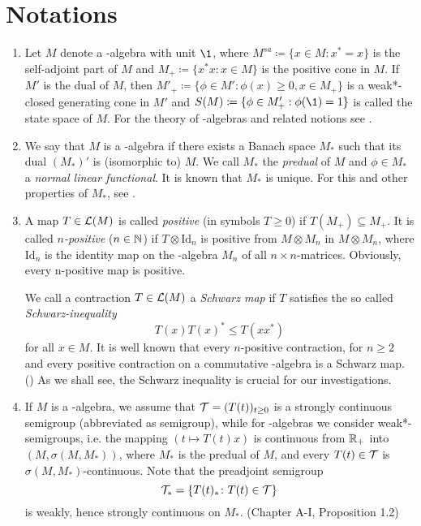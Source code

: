 \section{Notations}\label{sec:d1-1}
\begin{enumerate}[1., wide, labelsep=1em]

\item
Let $ M $ denote a \CA-algebra with unit $ \1 $, where 
%
$
	M^{sa} \coloneqq \{x \in M \colon x^{*} = x\} 
$
%
is the self-adjoint part of $ M $ and 
%
$
	M_{+} \coloneqq \{ x^{*}x \colon x \in M\} 
$
%
is the positive cone in $ M $.
If $ M' $ is the dual of $ M $, then 
%
$
	M'_{+} \coloneqq \{\phi \in M' \colon \phi(x) \geq 0, x \in M_{+}\} 
$
%
is a weak*-closed generating cone in $ M' $ and 
%
$
	S(M) \coloneqq \{\phi \in M'_{+}: \phi(\1) = 1\} 
$
%
is called the state space of $ M $. 
For the theory of \CA-algebras and related notions see \citet{Pedersen:1979}.

\item
We say that $ M $ is a \WA-algebra if there exists a Banach space $ M_{*} $ such that its dual $ (M_{*})' $ is (isomorphic to) $ M $.
We call $ M_{*} $ the \emph{predual} of $ M $ and $ \phi \in M_{*} $ a \emph{normal linear functional}.
It is known that $ M_{*} $ is unique. %
For this and other properties of $M_{*} $, see \citet[Chapter III]{takesaki:1979}.

\item
A map $ T \in \mathcal{L}(M) $ is called \emph{positive} (in symbols $ T \geq 0 $) if $ T(M_{+}) \subseteq M_{+} $.
It is called \emph{$n$-positive} ($ n \in \mathbb{N} $) if $ T \otimes \text{Id}_{n} $ is positive from $ M \otimes M_{n} $ in $ M \otimes M_{n} $, where $ \text{Id}_{n} $ is the identity map on the \CA-algebra $ M_{n} $ of all $ n \times n $-matrices.
Obviously, every n-positive map is positive.

We call a contraction $ T \in \mathcal{L}(M) $ a \emph{Schwarz map} if $ T $ satisfies the so called \emph{Schwarz-inequality}
\[
	T(x)T(x)^{*} \leq T(xx^{*}) 
\]
for all $ x \in M $.
It is well known that every $n$-positive contraction, for $ n \geq 2 $ and every positive contraction on a commutative \CA-algebra is a Schwarz map. (\citet[Chapter IV]{takesaki:1979})
As we shall see, the Schwarz inequality is crucial for our investigations.

\item 
If $ M $ is a \CA-algebra, we assume that $ \mathcal{T} = (T(t))_{t \geq 0} $ is a strongly continuous semigroup (abbreviated as semigroup), while for \WA-algebras we consider weak*-semigroups, i.e. the mapping $ (t \mapsto T(t)x) $ is continuous from $ \mathbb{R}_{+} $ into $ (M,\sigma(M,M_{*}))$, where $ M_{*} $ is the predual of $ M $, and every $ T(t) \in \mathcal{T} $ is $ \sigma(M,M_{*}) $-continuous.
Note that the preadjoint semigroup
\[
	\mathcal{T}_{*} = \{ T(t)_{*} \colon T(t) \in \mathcal{T} \}
\]
is weakly, hence strongly continuous on $ M_{*} $. (Chapter A-I, Proposition 1.2)%


\end{enumerate}
